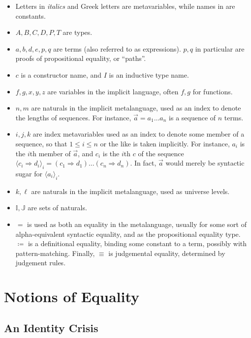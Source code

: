 \documentclass{report}
\newcommand{\const}[1]{\text{#1}}
\begin{document}
\begin{itemize}
    \item Letters in \textit{italics} and Greek letters are metavariables, while names in \const{roman} are constants. %
    \item $A, B, C, D, P, T$ are types.
    \item $a, b, d, e, p, q$ are terms (also referred to as expressions). $p, q$ in particular are proofs of propositional equality, or ``paths''.
    \item $c$ is a constructor name, and $I$ is an inductive type name.
    \item $f, g, x, y, z$ are variables in the implicit language, often $f, g$ for functions.
    \item $n, m$ are naturals in the implicit metalanguage, used as an index to denote the lengths of sequences. For instance, $\Vec{a} = a_1 \dots a_n$ is a sequence of $n$ terms.
    \item $i, j, k$ are index metavariables used as an index to denote some member of a sequence, so that $1 \leq i \leq n$ or the like is taken implicitly. For instance, $a_i$ is the $i$th member of $\Vec{a}$, and $c_i$ is the $i$th $c$ of the sequence $\langle c_i \Rightarrow d_i \rangle_i = (c_1 \Rightarrow d_1) \dots (c_n \Rightarrow d_n)$. In fact, $\Vec{a}$ would merely be syntactic sugar for $\langle a_i \rangle_i$.
    \item $k, \ell$ are naturals in the implicit metalanguage, used as universe levels.
    \item $\mathbb{I}, \mathbb{J}$ are sets of naturals.
    \item $=$ is used as both an equality in the metalanguage, usually for some sort of alpha-equivalent syntactic equality, and as the propositional equality type. $\coloneqq$ is a definitional equality, binding some constant to a term, possibly with pattern-matching. Finally, $\equiv$ is judgemental equality, determined by judgement rules.
\end{itemize}

\chapter{Notions of Equality}
\section{An Identity Crisis}
\end{document}
